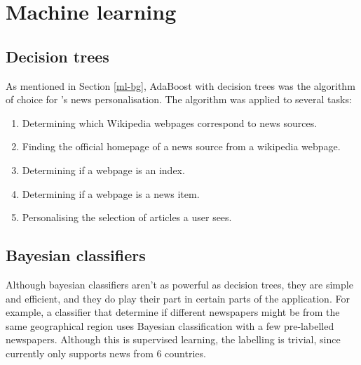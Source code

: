 \section{Machine learning\label{ml}}
\subsection{Decision trees} 
As mentioned in Section \ref{ml-bg}, AdaBoost 
with decision trees was the algorithm of choice for \nr{}'s news
personalisation.  The algorithm was applied to several tasks:
\begin{enumerate}
    \item Determining which Wikipedia webpages correspond to news sources.
    \item Finding the official homepage of a news source from a
          wikipedia webpage.
    \item Determining if a webpage is an index.
    \item Determining if a webpage is a news item.
    \item Personalising the selection of articles a user sees.
\end{enumerate}
\subsection{Bayesian classifiers}
Although bayesian classifiers aren't as powerful as decision trees,
they are simple and efficient, and they do play their part in certain
parts of the \nr{} application.  For example, a classifier that determine
if different newspapers might be from the same geographical region
uses Bayesian classification with a few pre-labelled newspapers.  Although
this is supervised learning, the labelling is trivial, since \nr{}
currently only supports news from 6 countries.
